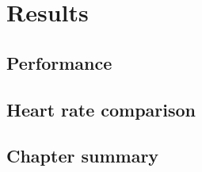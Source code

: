 \chapter{Results} \label{chap:results}

\section*{}


\section{Performance} \label{sec:results:perf}



\section{Heart rate comparison} \label{sec:results:heart}


\section{Chapter summary}

